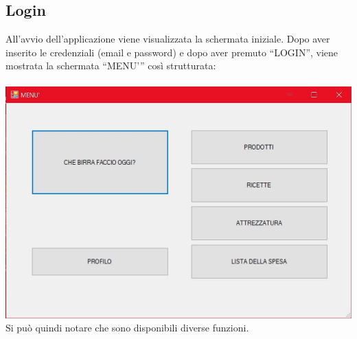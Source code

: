 \documentclass[a4paper, titlepage]{article}
\begin{document}
\subsection{Login}
All’avvio dell’applicazione viene visualizzata la schermata iniziale. Dopo aver inserito le credenziali (email e password) e dopo aver premuto “LOGIN”, viene mostrata la schermata “MENU’” così strutturata:\\\\
\includegraphics[scale=0.30]{Immagini/form/Form Menu.jpg}
\\Si può quindi notare che sono disponibili diverse funzioni.
\end{document}
